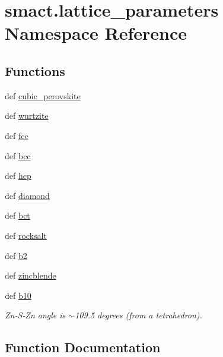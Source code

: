 \hypertarget{namespacesmact_1_1lattice__parameters}{}\section{smact.\+lattice\+\_\+parameters Namespace Reference}
\label{namespacesmact_1_1lattice__parameters}
\subsection*{Functions}
\begin{DoxyCompactItemize}
\item 
def \hyperlink{namespacesmact_1_1lattice__parameters_ad362e3a76b00a5dad0aab8ec370525d4}{cubic\+\_\+perovskite}
\item 
def \hyperlink{namespacesmact_1_1lattice__parameters_ad9f584d4e062d087e18aeca194c2537b}{wurtzite}
\item 
def \hyperlink{namespacesmact_1_1lattice__parameters_a4e67c0acfd178548e38a8ae341791259}{fcc}
\item 
def \hyperlink{namespacesmact_1_1lattice__parameters_a797eec432832ec55c5da86125c120779}{bcc}
\item 
def \hyperlink{namespacesmact_1_1lattice__parameters_a09030d3085ef12b8a3d03ce1f1ebc3d0}{hcp}
\item 
def \hyperlink{namespacesmact_1_1lattice__parameters_a91b06ba66685101060602b6ce67544f3}{diamond}
\item 
def \hyperlink{namespacesmact_1_1lattice__parameters_a26ba203667ced3e22d3a81ec900697a3}{bct}
\item 
def \hyperlink{namespacesmact_1_1lattice__parameters_aedc15cf81227b0bbd8fae3e7154b5367}{rocksalt}
\item 
def \hyperlink{namespacesmact_1_1lattice__parameters_ae51af656e3f0d10e9a8e12faa3eabfd7}{b2}
\item 
def \hyperlink{namespacesmact_1_1lattice__parameters_a4d323fb11b47663e45019e765158e1b1}{zincblende}
\item 
def \hyperlink{namespacesmact_1_1lattice__parameters_a632d06c0e2efba1c03f4d42b85792b76}{b10}
\begin{DoxyCompactList}\small\item\em Zn-\/\+S-\/\+Zn angle is $\sim$109.5 degrees (from a tetrahedron). \end{DoxyCompactList}\end{DoxyCompactItemize}


\subsection{Function Documentation}
\hypertarget{namespacesmact_1_1lattice__parameters_a632d06c0e2efba1c03f4d42b85792b76}{}
